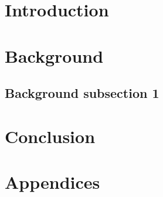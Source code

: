 

\newcommand{\courseName}{Machine Learning \& Vision Systems}
\newcommand{\courseCode}{MFET 4015}
\newcommand{\dueDate}{12/04/22}
\newcommand{\supervisors}{Professor Lee Sang-Heon\\ Md Ahasan Kabir}
\newcommand{\submissionType}{Group Project}
\newcommand{\submissionTitle}{Image Processing using MATLAB}
\newcommand{\headerTitle}{\submissionTitle}


\FloatBarrier
{} %


\section{Introduction}
\FloatBarrier

\clearpage\section{Background}
\subsection{Background subsection 1}

\clearpage\section{Conclusion}
\FloatBarrier

\clearpage
% 



\clearpage\section{Appendices}


